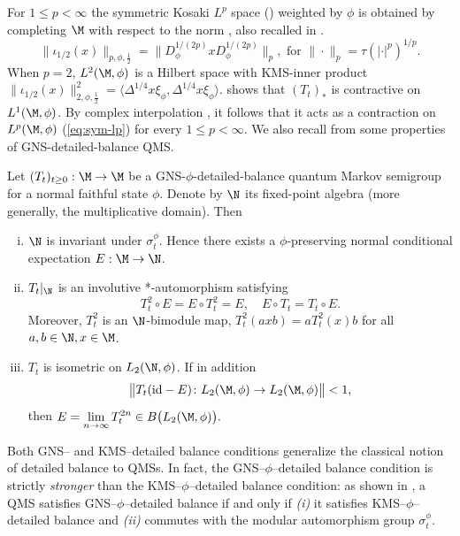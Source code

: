 \documentclass[sn-mathphys-num]{sn-jnl}
\begin{document}
For $1\le p<\infty$ the symmetric Kosaki $L^{p}$ space () weighted by $\phi$
is obtained by completing $\M$ with respect to the norm \cite{kosaki_applications_1984}, also recalled in .
\[
  \|\iota_{1/2}(x)\|_{p,\phi,\frac{1}2{}}
   =
  \bigl\|D_\phi^{1/(2p)} x D_\phi^{1/(2p)}\bigr\|_{p}, \text{ for }
  \|\cdot\|_{p}=\tau(|\cdot|^{p})^{1/p}.
\]
When $p=2$, $L^{2}(\M,\phi)$ is a Hilbert space with KMS-inner product
$
  \| \iota_{1/2}(x)\|^2_{2,\phi,\frac 12}
  =\langle\Delta^{1/4}x\xi_\phi,\Delta^{1/4}x\xi_\phi\rangle.
$
 shows that $(T_t)_*$ is contractive on $L^{1}(\M,\phi)$. By complex interpolation \cite{kosaki_applications_1984}, it follows that it acts as a contraction on
$L^{p}(\M,\phi)$ (\cref{eq:sym-lp}) for every $1\le p<\infty$.
We also recall from \cite[Proposition~4.2]{Gao_Junge_LaRacuente_Li_2025} some properties of GNS-detailed-balance QMS.

\begin{lemma}\label{lem:cd2}
Let $(T_t)_{t\geq0}:\M\to\M$ be a GNS-$\phi$-detailed-balance quantum Markov semigroup for a normal faithful state $\phi$. Denote by $\N$ its fixed-point algebra (more generally, the multiplicative domain). Then
\begin{enumerate}[(i)]
  \item $\N$ is invariant under $\sigma_t^\phi$.  Hence there exists a $\phi$-preserving normal conditional expectation $E:\M\to\N$.
  \item $T_t|_{\N}$ is an involutive *-automorphism satisfying
    \[
      T_t^2\circ E  =  E\circ T_t^2  =  E,
      \quad
      E\circ T_t  =  T_t\circ E.
    \]
    Moreover, $T_t^2$ is an $\N$-bimodule map,
    $ T_t^2(a x b)=a T_t^2(x) b$  for all $a,b\in\N, x\in\M$.
  \item $T_t$ is isometric on $L_2(\N,\phi)$.  If in addition
    \[
      \bigl\|T_t(\mathrm{id}-E)\colon L_2(\M,\phi)\to L_2(\M,\phi)\bigr\|<1,
    \]
    then
    $
      E  = \displaystyle \lim_{n\to\infty} T_t^{2n} \in B\bigl(L_2(\M,\phi)\bigr).
    $
\end{enumerate}
\end{lemma}
\begin{remark}\label{rmk:gns-kms}
    Both GNS-- and KMS--detailed balance conditions generalize the classical notion of detailed balance to QMSs. In fact, the GNS--$\phi$--detailed balance condition is strictly \emph{stronger} than the KMS--$\phi$--detailed balance condition: as shown in \cite{Giorgetti:2021wav,Wirth_2024}, a QMS satisfies GNS--$\phi$--detailed balance if and only if \emph{(i)} it satisfies KMS--$\phi$--detailed balance and \emph{(ii)} commutes with the modular automorphism group $\sigma^\phi_t$.
\end{remark}
\end{document}
